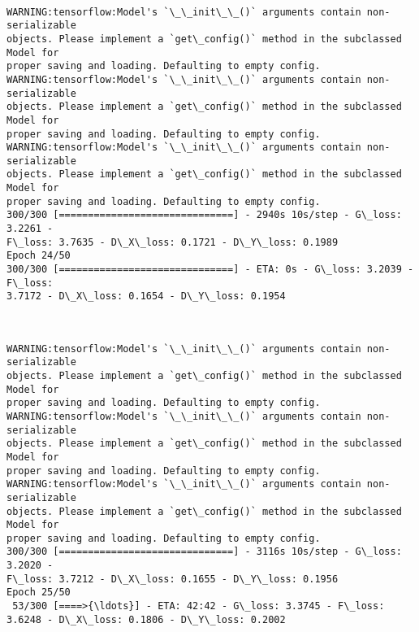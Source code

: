 \documentclass[11pt]{article}
\begin{document}
    \begin{center}
    \end{center}
    { \hspace*{\fill} \\}
    
    \begin{Verbatim}[commandchars=\\\{\}]
WARNING:tensorflow:Model's `\_\_init\_\_()` arguments contain non-serializable
objects. Please implement a `get\_config()` method in the subclassed Model for
proper saving and loading. Defaulting to empty config.
WARNING:tensorflow:Model's `\_\_init\_\_()` arguments contain non-serializable
objects. Please implement a `get\_config()` method in the subclassed Model for
proper saving and loading. Defaulting to empty config.
WARNING:tensorflow:Model's `\_\_init\_\_()` arguments contain non-serializable
objects. Please implement a `get\_config()` method in the subclassed Model for
proper saving and loading. Defaulting to empty config.
300/300 [==============================] - 2940s 10s/step - G\_loss: 3.2261 -
F\_loss: 3.7635 - D\_X\_loss: 0.1721 - D\_Y\_loss: 0.1989
Epoch 24/50
300/300 [==============================] - ETA: 0s - G\_loss: 3.2039 - F\_loss:
3.7172 - D\_X\_loss: 0.1654 - D\_Y\_loss: 0.1954
    \end{Verbatim}

    \begin{center}
    \end{center}
    { \hspace*{\fill} \\}
    
    \begin{Verbatim}[commandchars=\\\{\}]
WARNING:tensorflow:Model's `\_\_init\_\_()` arguments contain non-serializable
objects. Please implement a `get\_config()` method in the subclassed Model for
proper saving and loading. Defaulting to empty config.
WARNING:tensorflow:Model's `\_\_init\_\_()` arguments contain non-serializable
objects. Please implement a `get\_config()` method in the subclassed Model for
proper saving and loading. Defaulting to empty config.
WARNING:tensorflow:Model's `\_\_init\_\_()` arguments contain non-serializable
objects. Please implement a `get\_config()` method in the subclassed Model for
proper saving and loading. Defaulting to empty config.
300/300 [==============================] - 3116s 10s/step - G\_loss: 3.2020 -
F\_loss: 3.7212 - D\_X\_loss: 0.1655 - D\_Y\_loss: 0.1956
Epoch 25/50
 53/300 [====>{\ldots}] - ETA: 42:42 - G\_loss: 3.3745 - F\_loss:
3.6248 - D\_X\_loss: 0.1806 - D\_Y\_loss: 0.2002
    \end{Verbatim}
\end{document}

